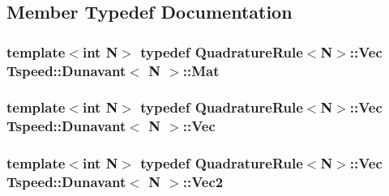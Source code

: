 \subsection{Member Typedef Documentation}
\hypertarget{classTspeed_1_1Dunavant_a87e65aed6cfa6ace8ea6374f3b005d78}{
\subsubsection[{Mat}]{\setlength{\rightskip}{0pt plus 5cm}template$<$int N$>$ typedef Quadrature\-Rule$<$N$>$\-::{\bf Vec} {\bf Tspeed\-::\-Dunavant}$<$ N $>$\-::Mat}}\label{classTspeed_1_1Dunavant_a87e65aed6cfa6ace8ea6374f3b005d78}
\hypertarget{classTspeed_1_1Dunavant_a8562daa3d038126144415fa4ba851e81}{
\subsubsection[{Vec}]{\setlength{\rightskip}{0pt plus 5cm}template$<$int N$>$ typedef Quadrature\-Rule$<$N$>$\-::Vec {\bf Tspeed\-::\-Dunavant}$<$ N $>$\-::Vec}}\label{classTspeed_1_1Dunavant_a8562daa3d038126144415fa4ba851e81}
\hypertarget{classTspeed_1_1Dunavant_acc838f609850fd31cbbeb87578b1a8c5}{
\subsubsection[{Vec2}]{\setlength{\rightskip}{0pt plus 5cm}template$<$int N$>$ typedef Quadrature\-Rule$<$N$>$\-::{\bf Vec} {\bf Tspeed\-::\-Dunavant}$<$ N $>$\-::Vec2}}\label{classTspeed_1_1Dunavant_acc838f609850fd31cbbeb87578b1a8c5}


